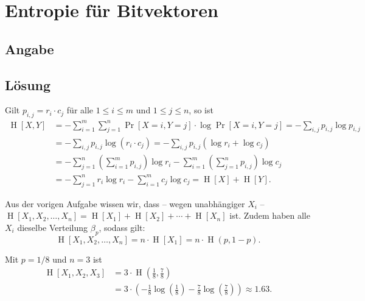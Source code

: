 \section*{Entropie für Bitvektoren}
\subsection*{Angabe}


\subsection*{Lösung}
\begin{flushenum}
	\item Gilt $p_{i,j} = r_i \cdot c_j$ für alle  $1 \leq i \leq m$ und $1
		\leq j \leq n$, so ist
		\begin{align*}
			\operatorname{H}[X,Y] &= -\sum_{i=1}^m \sum_{j=1}^n
			\Pr[X=i, Y=j] \cdot \log \Pr[X=i, Y=j] = - \sum_{i,j}
			p_{i,j} \log p_{i,j} \\
			&= - \sum_{i,j} p_{i,j} \log \left(r_i \cdot c_j\right) =
			- \sum_{i,j} p_{i,j}\left(\log r_i + \log c_j\right) \\
			&= - \sum_{j=1}^n \left(\sum_{i=1}^m p_{i,j}\right)
			\log r_i - \sum_{i=1}^m \left(\sum_{j=1}^n
			p_{i,j}\right) \log c_j \\ 
			&= - \sum_{j=1}^n r_i \log r_i - \sum_{i=1}^m c_j \log
			c_j = \operatorname{H}[X] + \operatorname{H}[Y].
		\end{align*}
	\item \begin{flushalpha}
		\item Aus der vorigen Aufgabe wissen wir, dass -- wegen
			unabhängiger $X_i$ --
			$\operatorname{H}[X_1,X_2,\dots,X_n] =
			\operatorname{H}[X_1] + \operatorname{H}[X_2] + \cdots
			+ \operatorname{H}[X_n]$ ist. Zudem haben alle $X_i$
			dieselbe Verteilung $\beta_p$, sodass gilt:
			\[
			  \operatorname{H}[X_1,X_2,\dots,X_n] = n \cdot
			  \operatorname{H}[X_1] = n \cdot
			  \operatorname{H}(p,1-p).
			\]
		\item Mit $p=1/8$ und $n=3$ ist
			\begin{align*}
				\operatorname{H}[X_1,X_2,X_3] &= 3 \cdot
				\operatorname{H}\left(\frac{1}{8},\frac{7}{8}\right)
				\\
				&= 3 \cdot \left(- \frac{1}{8}
				\log\left(\frac{1}{8}\right) - \frac{7}{8}
				\log\left(\frac{7}{8}\right)\right) \approx 1.63. \\

\end{align*}
\end{flushalpha}
\end{flushenum}
